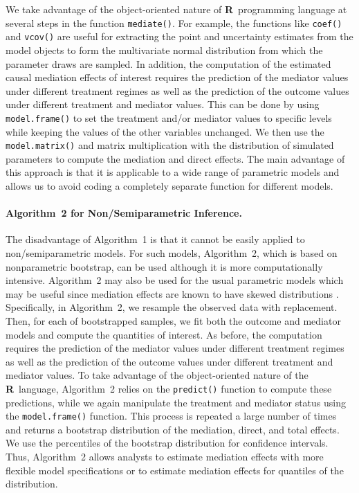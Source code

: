 \documentclass[11pt,letterpaper]{article}
\theoremstyle{plain}
\newcommand\bR{{\bf R}}
\begin{document}
We take advantage of the object-oriented nature of \bR\ programming
language at several steps in the function {\tt mediate()}.  For
example, the functions like {\tt coef()} and {\tt vcov()} are useful
for extracting the point and uncertainty estimates from the model
objects to form the multivariate normal distribution from which the
parameter draws are sampled.  In addition, the computation of the
estimated causal mediation effects of interest requires the prediction
of the mediator values under different treatment regimes as well as
the prediction of the outcome values under different treatment and
mediator values.  This can be done by using {\tt model.frame()} to set
the treatment and/or mediator values to specific levels while keeping
the values of the other variables unchanged.  We then use the {\tt
  model.matrix()} and matrix multiplication with the distribution of
simulated parameters to compute the mediation and direct effects.  The
main advantage of this approach is that it is applicable to a wide
range of parametric models and allows us to avoid coding a completely
separate function for different models.

\paragraph{Algorithm~2 for Non/Semiparametric Inference.}

The disadvantage of Algorithm~1 is that it cannot be easily applied to
non/semiparametric models.  For such models, Algorithm~2, which is
based on nonparametric bootstrap, can be used although it is more
computationally intensive.  Algorithm~2 may also be used for the usual
parametric models which may be useful since mediation effects are
known to have skewed distributions
\citep[e.g.,][]{MacKinnon:2004,Preacher:Hayes:08}.  Specifically, in
Algorithm~2, we resample the observed data with replacement.  Then,
for each of bootstrapped samples, we fit both the outcome and mediator
models and compute the quantities of interest.  As before, the
computation requires the prediction of the mediator values under
different treatment regimes as well as the prediction of the outcome
values under different treatment and mediator values.  To take
advantage of the object-oriented nature of the \bR\ language,
Algorithm~2 relies on the \texttt{predict()} function to compute these
predictions, while we again manipulate the treatment and mediator
status using the \texttt{model.frame()} function. This process is
repeated a large number of times and returns a bootstrap distribution
of the mediation, direct, and total effects.  We use the percentiles
of the bootstrap distribution for confidence intervals. Thus,
Algorithm~2 allows analysts to estimate mediation effects with more
flexible model specifications or to estimate mediation effects for
quantiles of the distribution.
\end{document}
